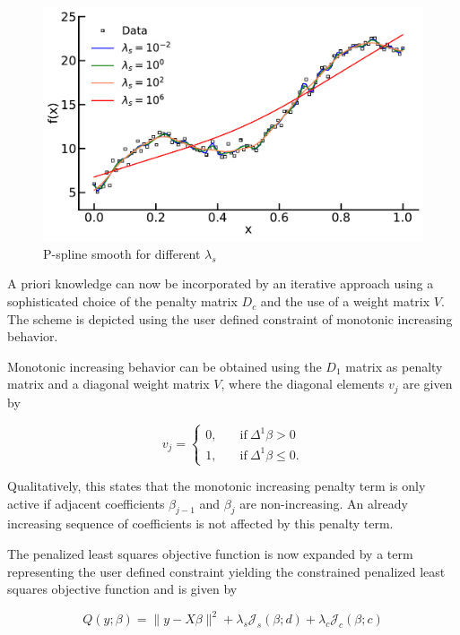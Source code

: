 \documentclass[10pt,a4paper]{article}
\begin{document}
	
	\begin{figure}[H]
		\centering
		\includegraphics[width=\linewidth]{../thesisplots/p_splines.pdf}
		\caption{P-spline smooth for different $\lambda_s$}
		\label{fig:pspline}
	\end{figure}
			
	A priori knowledge can now be incorporated by an iterative approach using a sophisticated choice of the penalty matrix $D_c$ and the use of a weight matrix $V$. The scheme is depicted using the user defined constraint of monotonic increasing behavior.  
	
	Monotonic increasing behavior can be obtained using the $D_1$ matrix as penalty matrix and a diagonal weight matrix $V$, where the diagonal elements $v_j$ are given by
	
	$$v_j = \begin{cases} 0, & \quad \text{if} \ \Delta^1 \beta > 0 \\ 
						  1, & \quad \text{if} \ \Delta^1 \beta \le 0.
		 	\end{cases}$$
	
	Qualitatively, this states that the monotonic increasing penalty term is only active if adjacent coefficients $\beta_{j-1}$ and $\beta_j$ are non-increasing. An already increasing sequence of coefficients is not affected by this penalty term. \cite{hofner2011monotonicity}
	
	The penalized least squares objective function is now expanded by a term representing the user defined constraint yielding the constrained penalized least squares objective function and is given by
	
	\begin{equation} \label{PLSc}
	    Q(y; \beta) = \lVert y - X\beta \rVert^2 + \lambda_s \mathcal J_s(\beta; d) + \lambda_c \mathcal J_c(\beta; c)
	\end{equation}
	
\end{document}

